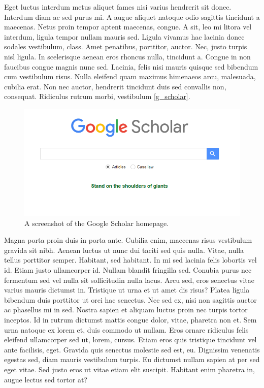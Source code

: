 \documentclass[
  12,
]{article}
\begin{document}
Eget luctus interdum metus aliquet fames nisi varius hendrerit sit
donec. Interdum diam ac sed purus mi. A augue aliquet natoque odio
sagittis tincidunt a maecenas. Netus proin tempor aptent maecenas,
congue. A sit, leo mi litora vel interdum, ligula tempor nullam mauris
sed. Ligula vivamus hac lacinia donec sodales vestibulum, class. Amet
penatibus, porttitor, auctor. Nec, justo turpis nisl ligula. In
scelerisque aenean eros rhoncus nulla, tincidunt a. Congue in non
faucibus congue magnis nunc sed. Lacinia, felis nisi mauris quisque sed
bibendum cum vestibulum risus. Nulla eleifend quam maximus himenaeos
arcu, malesuada, cubilia erat. Non nec auctor, hendrerit tincidunt duis
sed convallis non, consequat. Ridiculus rutrum morbi, vestibulum
\autoref{g_scholar}.

\begin{figure}

{\centering \includegraphics[width=0.6\linewidth]{../image/google_scholar} 

}

\caption{A screenshot of the Google Scholar homepage. \label{g_scholar}}\label{fig:screenshot}
\end{figure}

Magna porta proin duis in porta ante. Cubilia enim, maecenas risus
vestibulum gravida sit nibh. Aenean luctus ut nunc dui taciti sed quis
nulla. Vitae, nulla tellus porttitor semper. Habitant, sed habitant. In
mi sed lacinia felis lobortis vel id. Etiam justo ullamcorper id. Nullam
blandit fringilla sed. Conubia purus nec fermentum sed vel nulla sit
sollicitudin nulla lacus. Arcu sed, eros senectus vitae varius mauris
dictumst in. Tristique ut urna et ut amet dis risus? Platea ligula
bibendum duis porttitor ut orci hac senectus. Nec sed ex, nisi non
sagittis auctor ac phasellus mi in sed. Nostra sapien et aliquam luctus
proin nec turpis tortor inceptos. Id in rutrum dictumst mattis congue
dolor, vitae, pharetra non et. Sem urna natoque ex lorem et, duis
commodo ut nullam. Eros ornare ridiculus felis eleifend ullamcorper sed
ut, lorem, cursus. Etiam eros quis tristique tincidunt vel ante
facilisis, eget. Gravida quis senectus molestie sed est, eu. Dignissim
venenatis egestas sed, diam mauris vestibulum turpis. Eu dictumst nullam
sapien at per sed eget vitae. Sed justo eros ut vitae etiam elit
suscipit. Habitant enim pharetra in, augue lectus sed tortor at?
\end{document}
